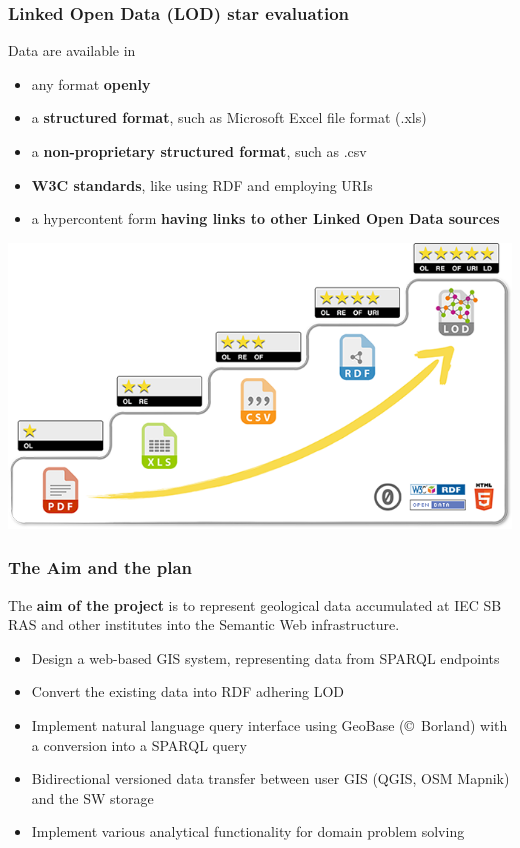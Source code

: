 \documentclass[10pt]{beamer}
\begin{document}
\begin{frame}
  \frametitle{Linked Open Data (LOD) star evaluation}
  Data are available in
  \begin{itemize}
  \item[\textbfr{1}] any format \textbf{openly}
  \item[\textbfr{2}] a \textbf{structured format}, such as Microsoft Excel file format (.xls)
  \item[\textbfr{3}] a \textbf{non-proprietary structured format}, such as .csv
  \item[\textbfr{4}] \textbf{W3C standards}, like using RDF and employing URIs
  \item[\textbfr{5}] a hypercontent form \textbf{having links to other Linked Open Data sources}
  \end{itemize}
  \begin{flushright}
   \includegraphics[width=0.7\linewidth]{5-star-lod.png}
  \end{flushright}
\end{frame}

\begin{frame}
  \frametitle{The Aim and the plan}
  The \textbf{aim of the project} is to represent geological data accumulated at IEC SB RAS and other institutes into the Semantic Web infrastructure.
  \begin{itemize}
  \item Design a web-based GIS system, representing data from SPARQL endpoints
  \item Convert the existing data into RDF adhering LOD
  \item Implement natural language query interface using GeoBase (\copyright~Borland) with a conversion into a SPARQL query
  \item Bidirectional versioned data transfer between user GIS (QGIS, OSM Mapnik) and the SW storage %
  \item Implement various analytical functionality for domain problem solving
  \end{itemize}
\end{frame}
\end{document}
